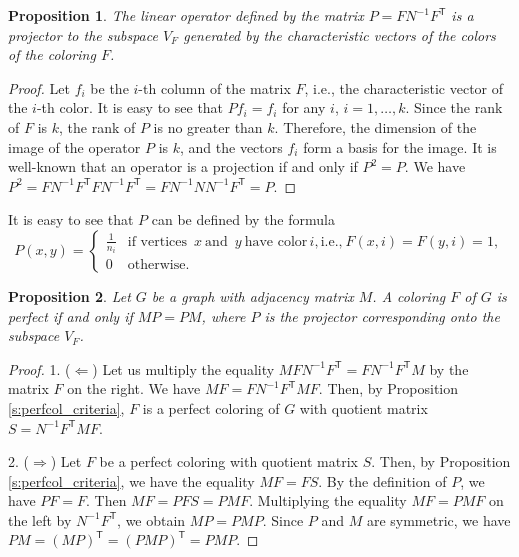 \documentclass[11pt]{article}
\newtheorem{claim}{Proposition}[section]
\theoremstyle{definition}
\begin{document}
\begin{claim}\label{claimprojector}
The linear operator defined by the matrix $P=FN^{-1}F^{\mathsf T}$ is a
projector to the subspace $V_F$ generated by the
characteristic vectors of the colors of the coloring $F$.
\end{claim}
\begin{proof}
Let $f_i$ be the $i$-th column of the matrix $F$, i.e.,
the characteristic vector of the $i$-th color. It is easy to see that
$Pf_i=f_i$ for any $i$, $i=1,\dots,k$. Since the rank of $F$
is $k$, the rank of  $P$ is no greater than $k$. Therefore,
the dimension of the image of the operator $P$ is $k$, and the vectors $f_i$
form a basis for the image. It is well-known that an operator is a projection  if and only if $P^2=P$.
We have $P^2=FN^{-1}F^{\mathsf T}FN^{-1}F^{\mathsf T}=FN^{-1}NN^{-1}F^{\mathsf T}=P$.
\end{proof}

It is easy to see that $P$ can be defined by the formula
\begin{equation}\label{eq:projector}
P(x,y)=\left\{
\begin{array}{ll}
\frac{1}{n_i} & \mbox{if vertices }\,x\  \mbox{and }\,y\  \mbox{have color}\,i,  \mbox{i.e.,}\ F(x,i)=F(y,i)=1,\\
0 & \mbox{otherwise}.
\end{array}
\right.
\end{equation}


\begin{claim}\label{claimprojector1} Let $G$ be a graph  with adjacency matrix $M$. A coloring $F$  of $G$ is perfect  if and only if $MP=PM$, where $P$ is the projector corresponding onto the subspace $V_F$.
\end{claim}
\begin{proof}
1. ($\Leftarrow$) Let us multiply the equality $MFN^{-1}F^{\mathsf T}=FN^{-1}F^{\mathsf T}M$ by
the matrix $F$ on the right. We have $MF=FN^{-1}F^{\mathsf T}MF$. Then, by
Proposition \ref{s:perfcol_criteria}, $F$ is a perfect coloring of $G$ with quotient matrix $S=N^{-1}F^{\mathsf T}MF$.

2. ($\Rightarrow$) Let $F$ be a perfect coloring with quotient matrix
$S$. Then, by Proposition \ref{s:perfcol_criteria}, we have the equality $MF=FS$. By the definition of $P$, we have $PF=F$. Then $MF=PFS=PMF$.
Multiplying the equality $MF=PMF$ on the left  by $N^{-1}F^{\mathsf T}$, we obtain
$MP=PMP$. Since  $P$ and $M$ are symmetric, we have
$PM=(MP)^{\mathsf T}=(PMP)^{\mathsf T}=PMP$.
\end{proof}
\end{document}
